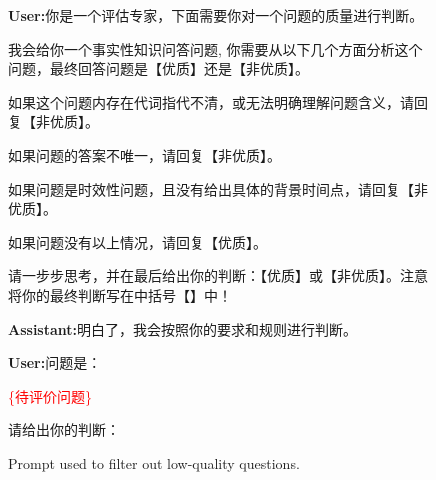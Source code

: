 \begin{CJK*}{UTF8}{gbsn}
\begin{figure*}[ht]
\centering
\begin{tcolorbox}[title=Question filtering, width=\textwidth]
\textbf{User:}你是一个评估专家，下面需要你对一个问题的质量进行判断。

我会给你一个事实性知识问答问题, 你需要从以下几个方面分析这个问题，最终回答问题是【优质】还是【非优质】。

如果这个问题内存在代词指代不清，或无法明确理解问题含义，请回复【非优质】。

如果问题的答案不唯一，请回复【非优质】。

如果问题是时效性问题，且没有给出具体的背景时间点，请回复【非优质】。

如果问题没有以上情况，请回复【优质】。

请一步步思考，并在最后给出你的判断：【优质】或【非优质】。注意将你的最终判断写在中括号【】中！

\vspace{1em}

\textbf{Assistant:}明白了，我会按照你的要求和规则进行判断。

\vspace{1em}

\textbf{User:}问题是：

\textcolor{red}{\{待评价问题\}}

请给出你的判断：

\vspace{1em}
\end{tcolorbox}
\caption {Prompt used to filter out low-quality questions.}
\label{fig:filter prompt}
\end{figure*}
\end{CJK*}

